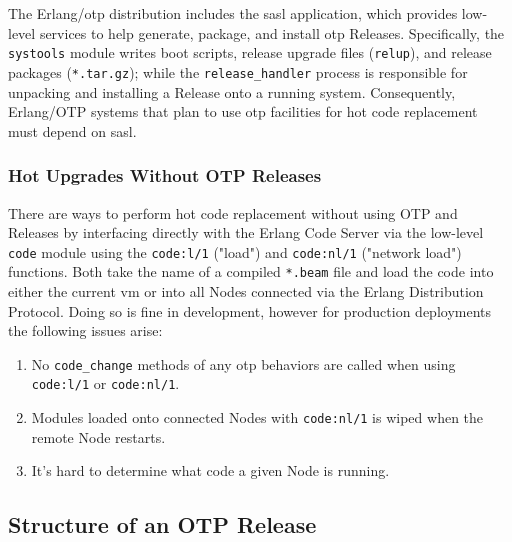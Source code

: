 The Erlang/\acrshort{otp} distribution includes the \acrfull{sasl} application, which provides low-level services to help generate, package, and install \acrshort{otp} Releases. Specifically, the \lstinline|systools| module writes boot scripts, release upgrade files (\lstinline|relup|), and release packages (\lstinline|*.tar.gz|); while the \lstinline|release_handler| process is responsible for unpacking and installing a Release onto a running system. Consequently, Erlang/OTP systems that plan to use \acrshort{otp} facilities for hot code replacement must depend on \acrshort{sasl}.

\subsubsection{Hot Upgrades Without OTP Releases}

There are ways to perform hot code replacement without using OTP and Releases by interfacing directly with the Erlang Code Server via the low-level \lstinline|code| module using the \lstinline|code:l/1| ("load") and \lstinline|code:nl/1| ("network load") functions. Both take the name of a compiled \lstinline|*.beam| file and load the code into either the current \acrshort{vm} or into all Nodes connected via the Erlang Distribution Protocol. Doing so is fine in development, however for production deployments the following issues arise:

\begin{enumerate}
\item No \lstinline|code_change| methods of any \acrshort{otp} behaviors are called when using \lstinline|code:l/1| or \lstinline|code:nl/1|.
\item Modules loaded onto connected Nodes with \lstinline|code:nl/1| is wiped when the remote Node restarts.
\item It's hard to determine what code a given Node is running.
\end{enumerate}


\subsection{Structure of an OTP Release}

